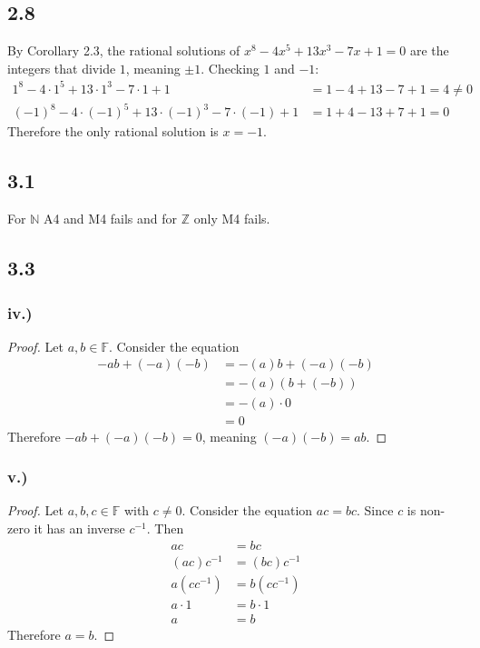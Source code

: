 \documentclass[12pt,titlepage]{extarticle}
\begin{document}
\subsection*{2.8}
By Corollary 2.3, the rational solutions of $x^8  - 4x^5 + 13x^3 - 7x + 1 = 0$ are the integers that divide $1$, meaning $\pm 1$. Checking $1$ and $-1$:
\begin{align*}
	1^8  - 4\cdot 1^5 + 13\cdot 1^3 - 7\cdot 1 + 1 &= 1 - 4 + 13 - 7 + 1 = 4 \neq 0 \\
	(-1)^8  - 4\cdot (-1)^5 + 13\cdot (-1)^3 - 7\cdot (-1) + 1 &= 1 + 4 - 13 + 7 + 1 = 0
\end{align*}
Therefore the only rational solution is $x = -1$.

\subsection*{3.1}
For $\mathbb{N}$ A4 and M4 fails and for $\mathbb{Z}$ only M4 fails.

\subsection*{3.3}
\subsubsection*{iv.)}
\begin{proof}
	Let $a,b \in \mathbb{F}$. Consider the equation
	\begin{align*}
		-ab + (-a)(-b) &= -(a)b + (-a)(-b) \tag{By iii} \\
					   &= -(a)(b + (-b)) \tag{By DL} \\
					   &= -(a) \cdot 0 \tag{By A4} \\
					   &= 0 \tag{By ii}
	\end{align*}
	Therefore $-ab + (-a)(-b) = 0$, meaning $(-a)(-b) = ab$.
\end{proof}

\subsubsection*{v.)}
\begin{proof}
	Let $a,b,c \in \mathbb{F}$ with $c \neq 0$. Consider the equation $ac = bc$. Since $c$ is non-zero it has an inverse $c^{-1}$. Then
	\begin{align*}
		ac &= bc \\
		(ac)c^{-1} &= (bc)c^{-1} \\
		a(cc^{-1}) &= b(cc^{-1}) \tag{By M1} \\
		a\cdot 1 &= b\cdot 1 \tag{By M4} \\
		a &= b \tag{By M3}
	\end{align*}
	Therefore $a = b$.
\end{proof}
\end{document}
